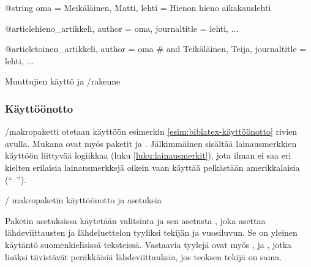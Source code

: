 \begin{esimerkki*}
\begin{koodilohko}
@string{
  oma = {Meikäläinen, Matti},
  lehti = {Hienon hieno aikakauslehti}
}

@article{hieno_artikkeli,
  author = oma,
  journaltitle = lehti,
  ...
}

@article{toinen_artikkeli,
  author = oma # { and Teikäläinen, Teija},
  journaltitle = lehti,
  ...
}
\end{koodilohko}
  \caption{Muuttujien käyttö ja \-/rakenne}
  \label{esim:bib-muuttujat}
\end{esimerkki*}

\subsubsection{Käyttöönotto}

\-/makropaketti otetaan käyttöön esimerkin
\ref{esim:biblatex-käyttöönotto} rivien avulla. Mukana ovat myös paketit
 ja . Jälkimmäinen sisältää
lainausmerkkien käyttöön liittyvää logiikkaa (luku
\ref{luku:lainausmerkit}), jota ilman  ei saa eri
kielten erilaisia lainausmerkkejä oikein vaan käyttää pelkästään
amerikkalaisia (``~'').

\begin{esimerkki*}

\begin{koodilohko}
\usepackage{polyglossia}

\usepackage{csquotes}

\usepackage[style=authoryear]{biblatex}
\end{koodilohko}
  \caption{\-/ makropaketin käyttöönotto ja asetuksia}
  \label{esim:biblatex-käyttöönotto}
\end{esimerkki*}

Paketin asetuksissa käytetään valitsinta  ja sen asetusta
, joka asettaa lähdeviittausten ja lähdeluettelon
tyyliksi tekijän ja vuosiluvun. Se on yleinen käytäntö suomenkielisissä
teksteissä. Vastaavia tyylejä ovat myös ,
 ja , jotka lisäksi
tiivistävät peräkkäisiä lähdeviittauksia, jos teoksen tekijä on sama.

